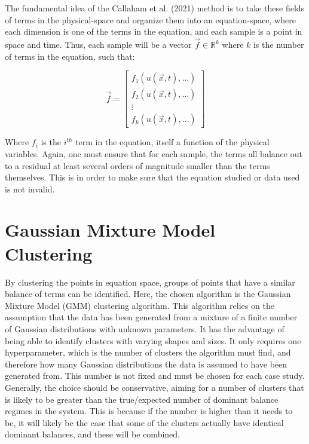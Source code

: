 \documentclass[12pt]{report} %
\begin{document}
\vspace{5mm}

The fundamental idea of the Callaham et al. (2021) method is to take these fields of terms in the physical-space and organize them into an equation-space, where each dimension is one of the terms in the equation, and each sample is a point in space and time. Thus, each sample will be a vector $\vec{f} \in \mathbb{R}^k$ where $k$ is the number of terms in the equation, such that:

\begin{equation}
    \vec{f} = \begin{bmatrix} f_1(u(\vec{x}, t), \hdots) \\ f_2(u(\vec{x}, t), \hdots) \\ \vdots \\ f_k(u(\vec{x}, t), \hdots) \end{bmatrix}
\end{equation}

Where $f_i$ is the $i^{th}$ term in the equation, itself a function of the physical variables. Again, one must ensure that for each sample, the terms all balance out to a residual at least several orders of magnitude smaller than the terms themselves. This is in order to make sure that the equation studied or data used is not invalid.


\section{Gaussian Mixture Model Clustering}

By clustering the points in equation space, groups of points that have a similar balance of terms can be identified. Here, the chosen algorithm is the Gaussian Mixture Model (GMM) clustering algorithm. This algorithm relies on the assumption that the data has been generated from a mixture of a finite number of Gaussian distributions with unknown parameters\cite{mit2015algorithmic}. It has the advantage of being able to identify clusters with varying shapes and sizes. It only requires one hyperparameter, which is the number of clusters the algorithm must find, and therefore how many Gaussian distributions the data is assumed to have been generated from\cite{sklearnGMM}. This number is not fixed and must be chosen for each case study. Generally, the choice should be conservative, aiming for a number of clusters that is likely to be greater than the true/expected number of dominant balance regimes in the system. This is because if the number is higher than it needs to be, it will likely be the case that some of the clusters actually have identical dominant balances, and these will be combined.
\end{document}
